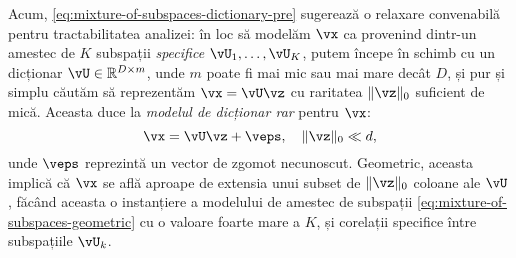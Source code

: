 \documentclass[../../book-main_ro.tex]{subfiles}
\begin{document}
Acum, \eqref{eq:mixture-of-subspaces-dictionary-pre} sugerează o relaxare convenabilă pentru tractabilitatea analizei: în loc să modelăm $\vx$ ca provenind dintr-un amestec de $K$ subspații \textit{specifice} $\vU_1, \dots, \vU_K$, putem începe în schimb cu un dicționar $\vU \in \R^{D \times m}$, unde $m$ poate fi mai mic sau mai mare decât $D$, și pur și simplu căutăm să reprezentăm $\vx = \vU \vz$ cu raritatea $\norm{\vz}_0$ suficient de mică.
Aceasta duce la \textit{modelul de dicționar rar} pentru $\vx$:
\begin{equation}\label{eq:mixture-of-subspaces-dictionary}
    \vx =  \vU \vz + \veps,
    \quad
    \norm{\vz}_0 \ll d,
\end{equation}
unde $\veps$ reprezintă un vector de zgomot necunoscut.
Geometric, aceasta implică că $\vx$ se află aproape de extensia unui subset de $\norm{\vz}_0$ coloane ale $\vU$,
făcând aceasta o instanțiere a modelului de amestec de subspații \eqref{eq:mixture-of-subspaces-geometric} cu o valoare foarte mare a $K$, și corelații specifice între subspațiile $\vU_k$.
\end{document}
